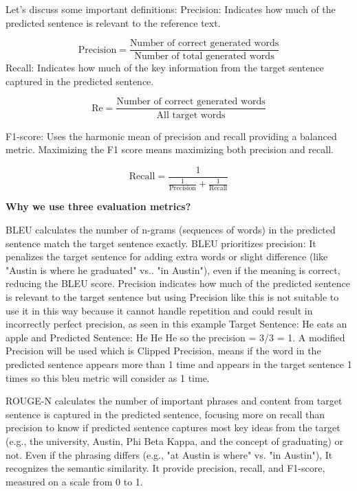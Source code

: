 \documentclass[journal]{IEEEtran}
\begin{document}
Let’s discuss some important definitions:
Precision: Indicates how much of the predicted sentence is relevant to the reference text. 

\begin{equation}
	\text{Precision} = \frac{\text{Number\ of\ correct\ generated\ words}}{\text{Number\ of\ total\ generated\ words}}
	\label{eq:precision}
\end{equation}
Recall: Indicates how much of the key information from the target sentence captured in the predicted sentence.

\begin{equation}
	\text{Re} = \frac{\text{Number\ of\ correct\ generated\ words}}{\text{All\ target\ words}}
	\label{eq:precision}
\end{equation}

F1-score: Uses the harmonic mean of precision and recall providing a balanced metric. Maximizing the F1 score means maximizing both precision and recall.

\begin{equation}
	\text{Recall} = \frac{\text{1}}{\frac{\text{1}}{\text{Precision}} + \frac{\text{1}}{\text{Recall}}}
	\label{eq:precision}
\end{equation}

\textbf{Why we use three evaluation metrics?}


BLEU calculates the number of n-grams (sequences of words) in the predicted sentence match the target sentence exactly. BLEU prioritizes precision: It penalizes the target sentence for adding extra words or slight difference (like "Austin is where he graduated" vs.. "in Austin"), even if the meaning is correct, reducing the BLEU score. Precision indicates how much of the predicted sentence is relevant to the target sentence but using Precision like this is not suitable to use it in this way because it cannot handle repetition and could result in incorrectly perfect precision, as seen in this example Target Sentence: He eats an apple and Predicted Sentence: He He He so the precision = 3/3 = 1. A modified Precision will be used which is Clipped Precision, means if the word in the predicted sentence appears more than 1 time and appears in the target sentence 1 times so this bleu metric will consider as 1 time.


ROUGE-N calculates the number of important phrases and content from target sentence is captured in the predicted sentence, focusing more on recall than precision to know if predicted sentence captures most key ideas from the target (e.g., the university, Austin, Phi Beta Kappa, and the concept of graduating) or not. Even if the phrasing differs (e.g., "at Austin is where" vs. "in Austin"), It recognizes the semantic similarity. It provide precision, recall, and F1-score, measured on a scale from 0 to 1. 
\end{document}
